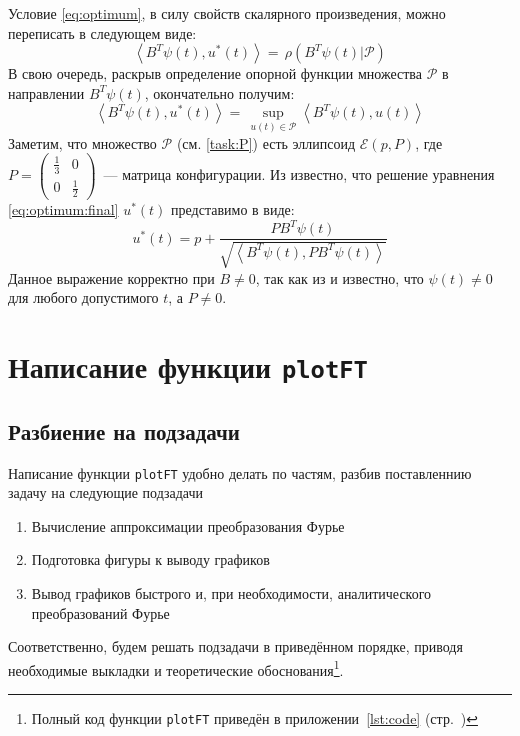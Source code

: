 \documentclass[11pt, oneside, final]{article}
\theoremstyle{break}
\numberwithin{equation}{section}
\theoremstyle{plain}
\theoremstyle{definition}
\newcommand{\scalar}[2]{\left< #1, #2\right>}
\begin{document}
    Условие \eqref{eq:optimum}, в силу свойств скалярного произведения, можно переписать в следующем виде:
    \begin{equation*}
        \scalar{B^{T}\psi(t)}{u^{*}(t)} = \, \rho(B^{T}\psi(t)|\mathcal{P}) \label{eq:optimum2}  
    \end{equation*}
    В свою очередь, раскрыв определение опорной функции множества \(\mathcal{P}\) в направлении \(B^{T}\psi(t)\), окончательно получим:
    \begin{equation}
        \label{eq:optimum:final}
        \scalar{B^{T}\psi(t)}{u^{*}(t)} = \, \sup_{u(t)\in\mathcal{P}}\scalar{B^{T}\psi(t)}{u(t)}
    \end{equation}
    Заметим, что множество \(\mathcal{P}\) (см. \eqref{task:P}) есть эллипсоид \( \mathcal{E}(p, P)\), где \(P = 
    \left(\begin{smallmatrix} \frac{1}{3} & 0 \\ 0 & \frac{1}{2} \end{smallmatrix}\right)\)~--- матрица конфигурации.
    Из \cite{Roublev:optimal:linear} известно, что решение уравнения \eqref{eq:optimum:final} \(u^{*}(t)\) представимо в виде:
    \begin{equation}
    \label{eq:control}
    u^{*}(t) = p + \dfrac{PB^{T}\psi(t)}{\sqrt{\scalar{B^{T}\psi(t)}{PB^{T}\psi(t)}}}
    \end{equation}
    Данное выражение корректно при \(B \neq 0\), так как из \cite{Roublev:optimal:nonlinear} и \cite{Pontr'yaginEtAl:maximum} известно, что \(\psi(t) \neq 0\) для любого допустимого \(t\), а \(P \neq 0\).
    \section{Написание функции \texttt{plotFT} } %
    \label{sec:programm}
    \subsection{Разбиение на подзадачи} %
    \label{sub:tasks}
    Написание функции \texttt{plotFT} удобно делать по частям, разбив поставленнию задачу на следующие подзадачи
    \begin{enumerate}
        \item Вычисление аппроксимации преобразования Фурье
        \item Подготовка фигуры к выводу графиков
        \item Вывод графиков быстрого и, при необходимости, аналитического преобразований Фурье 
    \end{enumerate}
    Соответственно, будем решать подзадачи в приведённом порядке, приводя необходимые выкладки и теоретические обоснования\footnote{Полный код функции \texttt{plotFT} приведён в приложении~\ref{lst:code} (стр.~\pageref{lst:code})}.
\end{document}
